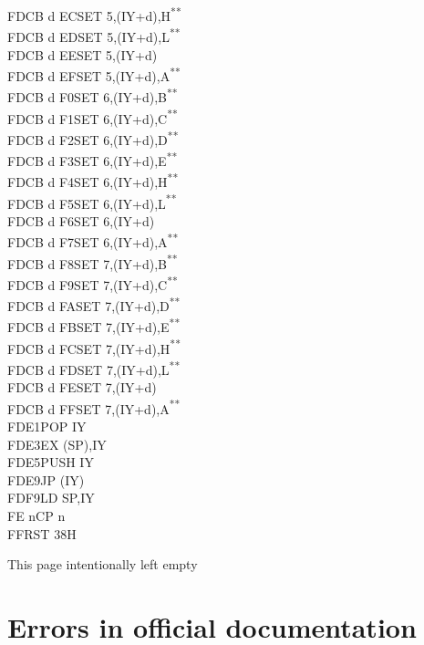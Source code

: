 \documentclass[12pt,twoside,openright,a4paper]{book}
\newcommand{\UNDOC}{\textnormal{\textsuperscript{**}}}
\newcommand{\intentiallyempty}{
	\mbox{}
	\vfill
	\begin{center}
	This page intentionally left empty
	\end{center}
	\vfill
	\mbox{}
}
\begin{document}
\begin{multicols}{3}
{\begin{tabbing}
	FDCB d EC\>SET 5,(IY+d),H\UNDOC\\
	FDCB d ED\>SET 5,(IY+d),L\UNDOC\\
	FDCB d EE\>SET 5,(IY+d)\\
	FDCB d EF\>SET 5,(IY+d),A\UNDOC\\
	FDCB d F0\>SET 6,(IY+d),B\UNDOC\\
	FDCB d F1\>SET 6,(IY+d),C\UNDOC\\
	FDCB d F2\>SET 6,(IY+d),D\UNDOC\\
	FDCB d F3\>SET 6,(IY+d),E\UNDOC\\
	FDCB d F4\>SET 6,(IY+d),H\UNDOC\\
	FDCB d F5\>SET 6,(IY+d),L\UNDOC\\
	FDCB d F6\>SET 6,(IY+d)\\
	FDCB d F7\>SET 6,(IY+d),A\UNDOC\\
	FDCB d F8\>SET 7,(IY+d),B\UNDOC\\
	FDCB d F9\>SET 7,(IY+d),C\UNDOC\\
	FDCB d FA\>SET 7,(IY+d),D\UNDOC\\
	FDCB d FB\>SET 7,(IY+d),E\UNDOC\\
	FDCB d FC\>SET 7,(IY+d),H\UNDOC\\
	FDCB d FD\>SET 7,(IY+d),L\UNDOC\\
	FDCB d FE\>SET 7,(IY+d)\\
	FDCB d FF\>SET 7,(IY+d),A\UNDOC\\
	FDE1\>POP IY\\
	FDE3\>EX (SP),IY\\
	FDE5\>PUSH IY\\
	FDE9\>JP (IY)\\
	FDF9\>LD SP,IY\\
	FE n\>CP n\\
	FF\>RST 38H
\end{tabbing}
}
\end{multicols}
\normalsize


\pagebreak
\intentiallyempty
\pagebreak


\chapter{Errors in official documentation}
\end{document}
